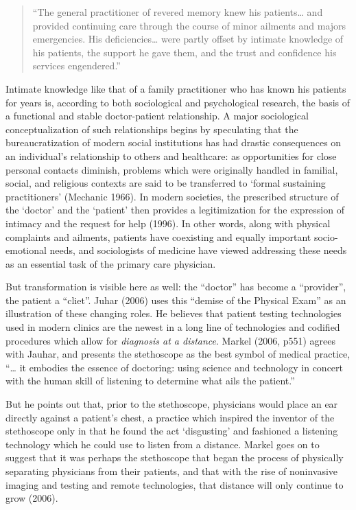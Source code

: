 \documentclass[12pt,twoside]{reedthesis}
\begin{document}
  \singlespace
  
  \begin{quote}
  ``The general practitioner of revered memory knew his patients\ldots{}
  and provided continuing care through the course of minor ailments and
  majors emergencies. His deficiencies\ldots{} were partly offset by
  intimate knowledge of his patients, the support he gave them, and the
  trust and confidence his services engendered.''
  \end{quote}
  
  \onehalfspacing
  
  Intimate knowledge like that of a family practitioner who has known his
  patients for years is, according to both sociological and psychological
  research, the basis of a functional and stable doctor-patient
  relationship. A major sociological conceptualization of such
  relationships begins by speculating that the bureaucratization of modern
  social institutions has had drastic consequences on an individual's
  relationship to others and healthcare: as opportunities for close
  personal contacts diminish, problems which were originally handled in
  familial, social, and religious contexts are said to be transferred to
  `formal sustaining practitioners' (Mechanic 1966). In modern societies,
  the prescribed structure of the `doctor' and the `patient' then provides
  a legitimization for the expression of intimacy and the request for help
  (1996). In other words, along with physical complaints and ailments,
  patients have coexisting and equally important socio-emotional needs,
  and sociologists of medicine have viewed addressing these needs as an
  essential task of the primary care physician.
  
  But transformation is visible here as well: the ``doctor'' has become a
  ``provider'', the patient a ``cliet''. Juhar (2006) uses this ``demise
  of the Physical Exam'' as an illustration of these changing roles. He
  believes that patient testing technologies used in modern clinics are
  the newest in a long line of technologies and codified procedures which
  allow for \emph{diagnosis at a distance}. Markel (2006, p551) agrees
  with Jauhar, and presents the stethoscope as the best symbol of medical
  practice, ``\ldots{} it embodies the essence of doctoring: using science
  and technology in concert with the human skill of listening to determine
  what ails the patient.''
  
  But he points out that, prior to the stethoscope, physicians would place
  an ear directly against a patient's chest, a practice which inspired the
  inventor of the stethoscope only in that he found the act `disgusting'
  and fashioned a listening technology which he could use to listen from a
  distance. Markel goes on to suggest that it was perhaps the stethoscope
  that began the process of physically separating physicians from their
  patients, and that with the rise of noninvasive imaging and testing and
  remote technologies, that distance will only continue to grow (2006).
  
\end{document}
